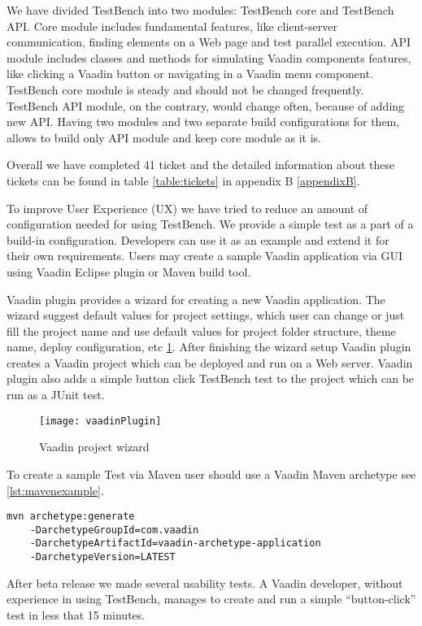 We have divided TestBench into two modules: TestBench core and TestBench API.
Core module includes fundamental features, like client-server communication, finding
elements on a Web page and test parallel execution. API module includes
classes and methods for simulating Vaadin components features, like clicking a
Vaadin button or navigating in a Vaadin menu component. TestBench core
module is steady and should not be changed frequently. TestBench API
module, on the contrary, would change often, because of adding new API. Having
two modules and two separate build configurations for them, allows to build only
API module and keep core module as it is. 

Overall we have completed 41 ticket
and the detailed information about these tickets can be found in table \ref{table:tickets} in appendix B \ref{appendixB}.

To improve User Experience (UX) we have tried to reduce an amount of
configuration needed for using TestBench. We provide a simple test as a
part of a build-in configuration.
Developers can use it as an example and extend it for their own requirements. Users may create a sample
Vaadin application via GUI using Vaadin Eclipse plugin or Maven build tool.

Vaadin plugin provides a wizard for creating a new Vaadin application. The
wizard suggest default values for project settings, which user can change or just fill
the project name and use default values for project folder structure, theme
name, deploy configuration, etc \ref{fig:vaadinPlugin}. After finishing the
wizard setup Vaadin plugin creates a Vaadin project which can be
deployed and run on a Web server. Vaadin plugin also adds a simple button click
TestBench test to the project which can be run as a JUnit test.
  \begin{figure}
  \centering
  \texttt{[image: vaadinPlugin]}
  \caption{Vaadin project wizard}
  \label{fig:vaadinPlugin}
  \end{figure}

To create a sample Test via Maven user should use a Vaadin Maven
archetype see \ref{lst:mavenexample}.
\lstset{style=console}
\begin{lstlisting}[caption=Create Vaadin sample application command.,label={lst:mavenexample}]
mvn archetype:generate 
	-DarchetypeGroupId=com.vaadin
	-DarchetypeArtifactId=vaadin-archetype-application
	-DarchetypeVersion=LATEST
\end{lstlisting}

After beta release we made several usability tests.
A Vaadin developer, without experience in using TestBench, manages to create and 
run a simple ``button-click'' test in less that 15 minutes. 

